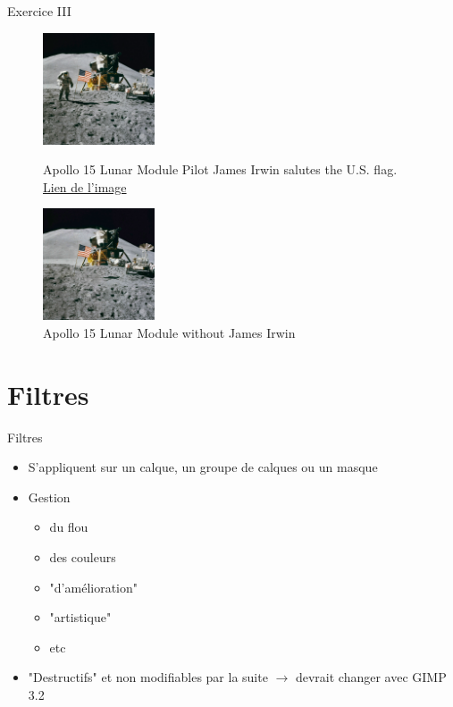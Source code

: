 \documentclass[10pt,svgnames,usenames,table]{beamer}
\begin{document}
	\begin{frame}{Exercice III}
	
		\begin{figure}[H]
			\centering
			\begin{minipage}{.5\textwidth}
				\centering
				\includegraphics[height=125px]{Images/purge/Apollo_15_flag,_rover,_LM,_Irwin}
				\caption{\tiny{Apollo 15 Lunar Module Pilot James Irwin salutes the U.S. flag.\\\href{http://louvainlinux.github.io/atelier-gimp/src/Images/purge/Apollo_15_flag,_rover,_LM,_Irwin.jpg}{Lien de l'image}}}
			\end{minipage}%
			\begin{minipage}{.5\textwidth}
				\centering
				\includegraphics[height=125px]{Images/purge/Apollo_15_flag,_rover,_LM}
				\caption{\tiny{Apollo 15 Lunar Module without James Irwin}}
			\end{minipage}
		\end{figure}	
	\end{frame}



\section{Filtres}
	\begin{frame}{Filtres}
		\begin{itemize}
			\item S'appliquent sur un calque, un groupe de calques ou un masque
			\item Gestion 
				\begin{itemize}
				\item du flou
				\item des couleurs
				\item "d'amélioration"
				\item "artistique"
				\item etc
				\end{itemize}
			\item "Destructifs" et non modifiables par la suite $\rightarrow$ devrait changer avec GIMP 3.2
		\end{itemize}
	\end{frame}
\end{document}
